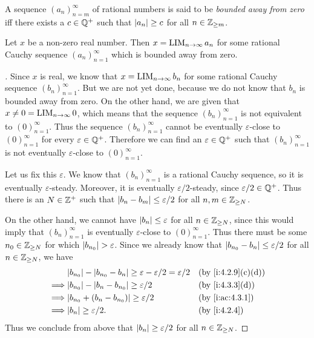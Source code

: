 \begin{defn}\label{i:5.3.12}
  A sequence \((a_n)_{n = m}^\infty\) of rational numbers is said to be \emph{bounded away from zero} iff there exists a \(c \in \mathbb{Q}^+\) such that \(\left\lvert a_n\right\rvert \geq c\) for all \(n \in \mathbb{Z}_{\geq m}\).
\end{defn}

\setcounter{thm}{13}
\begin{lem}\label{i:5.3.14}
  Let \(x\) be a non-zero real number.
  Then \(x = \operatorname*{LIM}_{n \to \infty} a_n\) for some rational Cauchy sequence \((a_n)_{n = 1}^{\infty}\) which is bounded away from zero.
\end{lem}

\begin{proof}[]
  Since \(x\) is real, we know that \(x = \operatorname*{LIM}_{n \to \infty} b_n\) for some rational Cauchy sequence \((b_n)_{n = 1}^{\infty}\).
  But we are not yet done, because we do not know that \(b_n\) is bounded away from zero.
  On the other hand, we are given that \(x \neq 0 = \operatorname*{LIM}_{n \to \infty} 0\), which means that the sequence \((b_n)_{n = 1}^{\infty}\) is not equivalent to \((0)_{n = 1}^{\infty}\).
  Thus the sequence \((b_n)_{n = 1}^{\infty}\) cannot be eventually \(\varepsilon\)-close to \((0)_{n = 1}^{\infty}\) for every \(\varepsilon \in \mathbb{Q}^+\).
  Therefore we can find an \(\varepsilon \in \mathbb{Q}^+\) such that \((b_n)_{n = 1}^{\infty}\) is not eventually \(\varepsilon\)-close to \((0)_{n = 1}^{\infty}\).

  Let us fix this \(\varepsilon\).
  We know that \((b_n)_{n = 1}^{\infty}\) is a rational Cauchy sequence, so it is eventually \(\varepsilon\)-steady.
  Moreover, it is eventually \(\varepsilon / 2\)-steady, since \(\varepsilon / 2 \in \mathbb{Q}^+\).
  Thus there is an \(N \in \mathbb{Z}^+\) such that \(\left\lvert b_n - b_m\right\rvert \leq \varepsilon / 2\) for all \(n, m \in \mathbb{Z}_{\geq N}\).

  On the other hand, we cannot have \(\left\lvert b_n\right\rvert \leq \varepsilon\) for all \(n \in \mathbb{Z}_{\geq N}\), since this would imply that \((b_n)_{n = 1}^{\infty}\) is eventually \(\varepsilon\)-close to \((0)_{n = 1}^{\infty}\).
  Thus there must be some \(n_0 \in \mathbb{Z}_{\geq N}\) for which \(\left\lvert b_{n_0}\right\rvert > \varepsilon\).
  Since we already know that \(\left\lvert b_{n_0} - b_n\right\rvert \leq \varepsilon / 2\) for all \(n \in \mathbb{Z}_{\geq N}\), we have
  \begin{align*}
             & \abs{b_{n_0}} - \abs{b_{n_0} - b_n} \geq \varepsilon - \varepsilon / 2 = \varepsilon / 2 &  & \by{i:4.2.9}[c,d] \\
    \implies & \abs{b_{n_0}} - \abs{b_n - b_{n_0}} \geq \varepsilon / 2                                 &  & \by{i:4.3.3}[d]   \\
    \implies & \abs{b_{n_0} + (b_n - b_{n_0})} \geq \varepsilon / 2                                     &  & \by{i:ac:4.3.1}   \\
    \implies & \abs{b_n} \geq \varepsilon / 2.                                                          &  & \by{i:4.2.4}
  \end{align*}
  Thus we conclude from above that \(\left\lvert b_n\right\rvert \geq \varepsilon / 2\) for all \(n \in \mathbb{Z}_{\geq N}\).


\end{proof}

